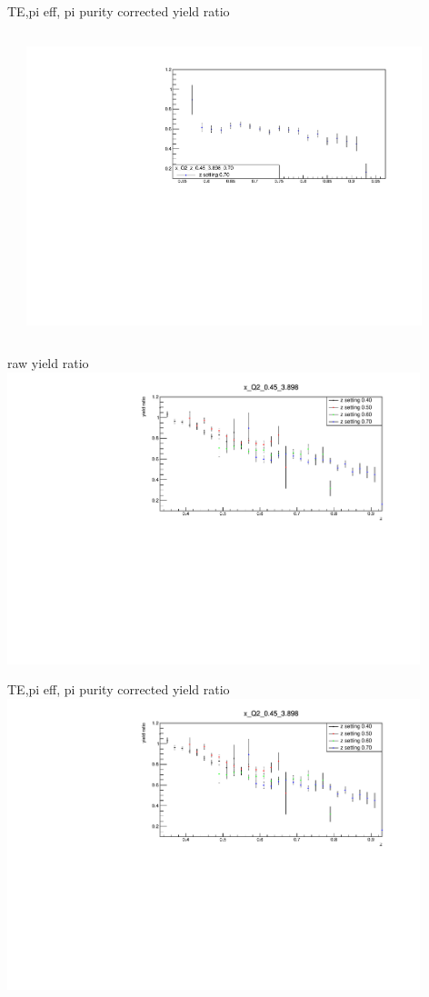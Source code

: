 \begin{frame}{TE,pi eff, pi purity corrected yield ratio}
\begin{columns}
\begin{column}[T]{0.5\textwidth}
\end{column}
\begin{column}[T]{0.5\textwidth}
\includegraphics[width = 0.9\textwidth]{results/yield/statistics_corr/x_Q2_z_0.45_3.898_0.70_ratio.pdf}
\end{column}
\end{columns}
\end{frame}
\begin{frame}{raw yield ratio}
\includegraphics[width = 0.9\textwidth]{results/yield/statistics/x_Q2_0.45_3.898_ratio.pdf}
\end{frame}
\begin{frame}{TE,pi eff, pi purity corrected yield ratio}
\includegraphics[width = 0.9\textwidth]{results/yield/statistics_corr/x_Q2_0.45_3.898_ratio.pdf}
\end{frame}
